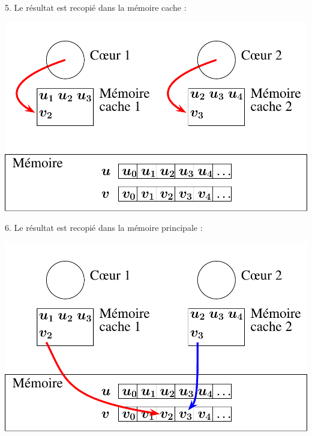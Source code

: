 \documentclass{beamer}
\begin{document}
\begin{frame}
	\parbox[t][1cm]{10cm}{5. Le résultat est recopié dans la mémoire cache :}
	\begin{center} 
		\includegraphics[scale=0.6]{../../Images/multithread4}
	\end{center}
\end{frame}

\begin{frame}
	\parbox[t][1cm]{10cm}{6. Le résultat est recopié dans la mémoire principale :}
	\begin{center}
		\includegraphics[scale=0.6]{../../Images/multithread5}
	\end{center}
\end{frame}
\end{document}
